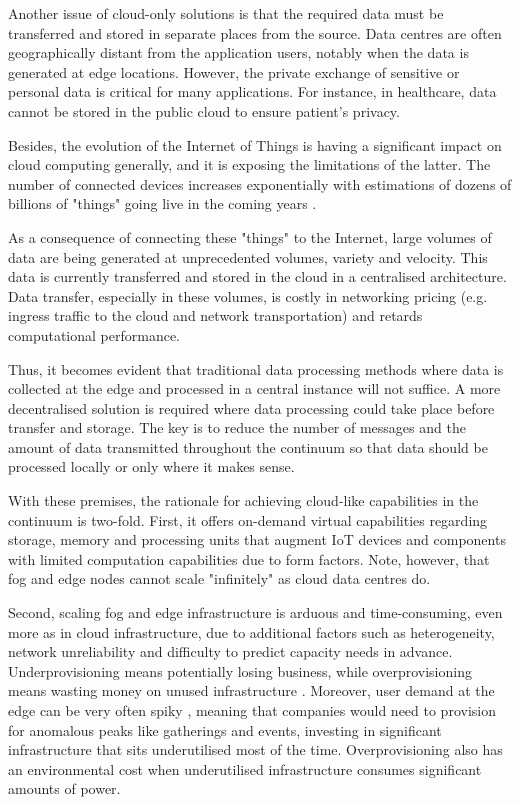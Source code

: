 Another issue of cloud-only solutions is that the required data must be transferred and stored in separate places from the source. Data centres are often geographically distant from the application users, notably when the data is generated at edge locations. However, the private exchange of sensitive or personal data is critical for many applications. For instance, in healthcare, data cannot be stored in the public cloud to ensure patient's privacy.

Besides, the evolution of the Internet of Things is having a significant impact on cloud computing generally, and it is exposing the limitations of the latter. The number of connected devices increases exponentially with estimations of dozens of billions of "things" going live in the coming years \cite{gartner-iot}.

As a consequence of connecting these "things" to the Internet, large volumes of data are being generated at unprecedented volumes, variety and velocity. This data is currently transferred and stored in the cloud in a centralised architecture. Data transfer, especially in these volumes, is costly in networking pricing (e.g. ingress traffic to the cloud and network transportation) and retards computational performance.

Thus, it becomes evident that traditional data processing methods where data is collected at the edge and processed in a central instance will not suffice. A more decentralised solution is required where data processing could take place before transfer and storage. The key is to reduce the number of messages and the amount of data transmitted throughout the continuum so that data should be processed locally or only where it makes sense.

With these premises, the rationale for achieving cloud-like capabilities in the continuum is two-fold. First, it offers on-demand virtual capabilities regarding storage, memory and processing units that augment IoT devices and components with limited computation capabilities due to form factors. Note, however, that fog and edge nodes cannot scale "infinitely" as cloud data centres do.

Second, scaling fog and edge infrastructure is arduous and time-consuming, even more as in cloud infrastructure, due to additional factors such as heterogeneity, network unreliability and difficulty to predict capacity needs in advance. Underprovisioning means potentially losing business, while overprovisioning means wasting money on unused infrastructure \cite{nygren2010akamai}.  Moreover, user demand at the edge can be very often spiky \cite{nygren2010akamai}, meaning that companies would need to provision for anomalous peaks like gatherings and events, investing in significant infrastructure that sits underutilised most of the time. Overprovisioning also has an environmental cost when underutilised infrastructure consumes significant amounts of power.

